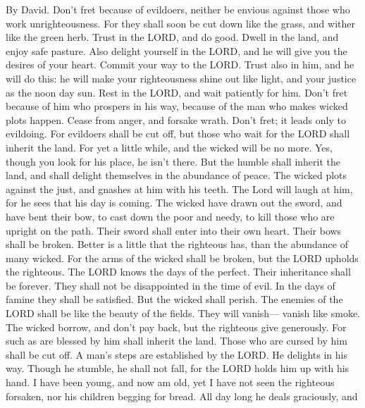 By David.  Don't fret because of evildoers, neither be
envious against those who work unrighteousness.  For they
shall soon be cut down like the grass, and wither like the green herb.
 Trust in the LORD, and do good. Dwell in the land, and
enjoy safe pasture.  Also delight yourself in the LORD, and
he will give you the desires of your heart.  Commit your way
to the LORD. Trust also in him, and he will do this:  he
will make your righteousness shine out like light, and your justice as
the noon day sun.  Rest in the LORD, and wait patiently for
him. Don't fret because of him who prospers in his way, because of the
man who makes wicked plots happen.  Cease from anger, and
forsake wrath. Don't fret; it leads only to evildoing.  For
evildoers shall be cut off, but those who wait for the LORD shall
inherit the land.  For yet a little while, and the wicked
will be no more. Yes, though you look for his place, he isn't there.
 But the humble shall inherit the land, and shall delight
themselves in the abundance of peace.  The wicked plots
against the just, and gnashes at him with his teeth.  The
Lord will laugh at him, for he sees that his day is coming.
 The wicked have drawn out the sword, and have bent their
bow, to cast down the poor and needy, to kill those who are upright on
the path.  Their sword shall enter into their own heart.
Their bows shall be broken.  Better is a little that the
righteous has, than the abundance of many wicked.  For the
arms of the wicked shall be broken, but the LORD upholds the righteous.
 The LORD knows the days of the perfect. Their inheritance
shall be forever.  They shall not be disappointed in the
time of evil. In the days of famine they shall be satisfied.
 But the wicked shall perish. The enemies of the LORD shall
be like the beauty of the fields. They will vanish--- vanish like smoke.
 The wicked borrow, and don't pay back, but the righteous
give generously.  For such as are blessed by him shall
inherit the land. Those who are cursed by him shall be cut off.
 A man's steps are established by the LORD. He delights in
his way.  Though he stumble, he shall not fall, for the
LORD holds him up with his hand.  I have been young, and
now am old, yet I have not seen the righteous forsaken, nor his children
begging for bread.  All day long he deals graciously, and
